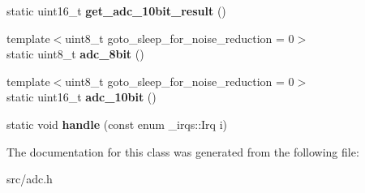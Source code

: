 \begin{DoxyCompactItemize}
\item 
static uint16\+\_\+t {\bfseries get\+\_\+adc\+\_\+10bit\+\_\+result} ()\hypertarget{classAdc_a0e21f4137413759d860b5cd57c81c279}{}\label{classAdc_a0e21f4137413759d860b5cd57c81c279}

\item 
{\footnotesize template$<$uint8\+\_\+t goto\+\_\+sleep\+\_\+for\+\_\+noise\+\_\+reduction = 0$>$ }\\static uint8\+\_\+t {\bfseries adc\+\_\+8bit} ()\hypertarget{classAdc_a067d8c599a9c5c7a64dd415c2cb4aa99}{}\label{classAdc_a067d8c599a9c5c7a64dd415c2cb4aa99}

\item 
{\footnotesize template$<$uint8\+\_\+t goto\+\_\+sleep\+\_\+for\+\_\+noise\+\_\+reduction = 0$>$ }\\static uint16\+\_\+t {\bfseries adc\+\_\+10bit} ()\hypertarget{classAdc_a1836caa64be8373caadc1aae11fbfe8c}{}\label{classAdc_a1836caa64be8373caadc1aae11fbfe8c}

\item 
static void {\bfseries handle} (const enum \+\_\+irqs\+::\+Irq i)\hypertarget{classAdc_a32efc28f22ff738decb003098194b1c5}{}\label{classAdc_a32efc28f22ff738decb003098194b1c5}

\end{DoxyCompactItemize}


The documentation for this class was generated from the following file\+:\begin{DoxyCompactItemize}
\item 
src/adc.\+h\end{DoxyCompactItemize}
